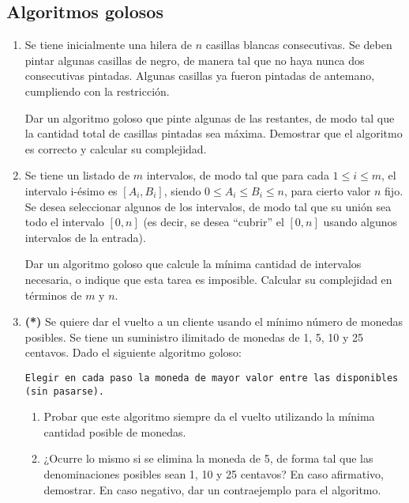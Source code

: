 \documentclass{article}
\begin{document}
\subsection*{Algoritmos golosos}

    \begin{enumerate}[resume]
        \item Se tiene inicialmente una hilera de $n$ casillas blancas consecutivas. Se deben pintar algunas casillas de negro, de manera tal que no haya nunca dos consecutivas pintadas. Algunas casillas ya fueron pintadas de antemano, cumpliendo con la restricción.
        
              Dar un algoritmo goloso que pinte algunas de las restantes, de modo tal que la cantidad total de casillas pintadas sea máxima. Demostrar que el algoritmo es correcto y calcular su complejidad.
        \item Se tiene un listado de $m$ intervalos, de modo tal que para cada $1 \leq i \leq m$, el intervalo i-ésimo es $[A_i, B_i]$, siendo $0 \leq A_i \leq B_i \leq n$, para cierto valor $n$ fijo. Se desea seleccionar algunos de los intervalos, de modo tal que
               su unión sea todo el intervalo $[0, n]$ (es decir, se desea ``cubrir'' el $[0,n]$ usando algunos intervalos de la entrada).
               
              Dar un algoritmo goloso que calcule la mínima cantidad de intervalos necesaria, o indique que esta tarea es imposible. Calcular su complejidad en términos de $m$ y $n$.
        \item \textbf{(*)} Se quiere dar el vuelto a un cliente usando el mínimo número de monedas posibles. Se tiene un suministro ilimitado de monedas de 1, 5, 10 y 25 centavos. Dado el siguiente algoritmo goloso:
        
         \texttt{Elegir en cada paso la moneda de mayor valor entre las disponibles (sin pasarse).}
        
        \begin{enumerate}
           \item Probar que este algoritmo siempre da el vuelto utilizando la mínima cantidad posible de monedas.
           \item ¿Ocurre lo mismo si se elimina la moneda de 5, de forma tal que las denominaciones posibles sean 1, 10 y 25 centavos? En caso afirmativo, demostrar. En caso negativo, dar un contraejemplo para el algoritmo.
        \end{enumerate}
        
    \end{enumerate}
    
\end{document}
